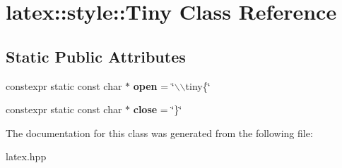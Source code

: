 \hypertarget{classlatex_1_1style_1_1Tiny}{\section{latex\-:\-:style\-:\-:\-Tiny \-Class \-Reference}
\label{classlatex_1_1style_1_1Tiny}
}
\subsection*{\-Static \-Public \-Attributes}
\begin{DoxyCompactItemize}
\item 
\hypertarget{classlatex_1_1style_1_1Tiny_a481c1c48ea808719f2b7386b9f9b2d1b}{constexpr static const char $\ast$ {\bfseries open} = \char`\"{}$\backslash$$\backslash$tiny\{\char`\"{}}\label{classlatex_1_1style_1_1Tiny_a481c1c48ea808719f2b7386b9f9b2d1b}

\item 
\hypertarget{classlatex_1_1style_1_1Tiny_a66ff1e8ca71e6c41a5d614765ffa52f2}{constexpr static const char $\ast$ {\bfseries close} = \char`\"{}\}\char`\"{}}\label{classlatex_1_1style_1_1Tiny_a66ff1e8ca71e6c41a5d614765ffa52f2}

\end{DoxyCompactItemize}


\-The documentation for this class was generated from the following file\-:\begin{DoxyCompactItemize}
\item 
latex.\-hpp\end{DoxyCompactItemize}
